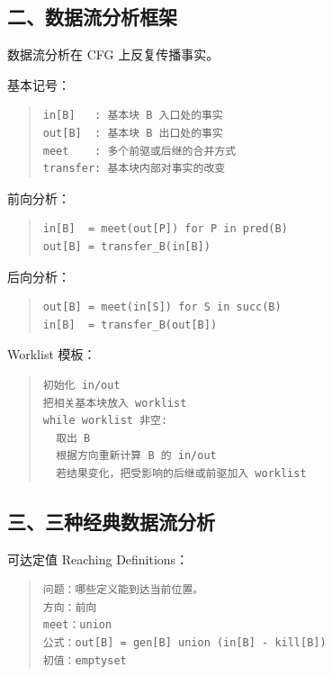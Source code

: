 \documentclass[UTF8,zihao=-4]{ctexart}
\begin{document}
\subsection{二、数据流分析框架}


数据流分析在 CFG 上反复传播事实。


基本记号：


\begin{quote}
\footnotesize
\begin{verbatim}
in[B]   : 基本块 B 入口处的事实
out[B]  : 基本块 B 出口处的事实
meet    : 多个前驱或后继的合并方式
transfer: 基本块内部对事实的改变
\end{verbatim}
\end{quote}


前向分析：


\begin{quote}
\footnotesize
\begin{verbatim}
in[B]  = meet(out[P]) for P in pred(B)
out[B] = transfer_B(in[B])
\end{verbatim}
\end{quote}


后向分析：


\begin{quote}
\footnotesize
\begin{verbatim}
out[B] = meet(in[S]) for S in succ(B)
in[B]  = transfer_B(out[B])
\end{verbatim}
\end{quote}


Worklist 模板：


\begin{quote}
\footnotesize
\begin{verbatim}
初始化 in/out
把相关基本块放入 worklist
while worklist 非空:
  取出 B
  根据方向重新计算 B 的 in/out
  若结果变化，把受影响的后继或前驱加入 worklist
\end{verbatim}
\end{quote}


\subsection{三、三种经典数据流分析}


可达定值 Reaching Definitions：


\begin{quote}
\footnotesize
\begin{verbatim}
问题：哪些定义能到达当前位置。
方向：前向
meet：union
公式：out[B] = gen[B] union (in[B] - kill[B])
初值：emptyset
\end{verbatim}
\end{quote}
\end{document}
